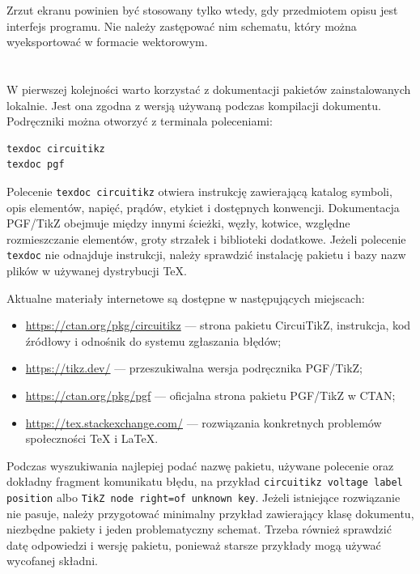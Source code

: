 Zrzut ekranu powinien być stosowany tylko wtedy, gdy przedmiotem opisu jest interfejs
programu. Nie należy zastępować nim schematu, który można wyeksportować w formacie
wektorowym.

\section{}

W pierwszej kolejności warto korzystać z dokumentacji pakietów zainstalowanych lokalnie.
Jest ona zgodna z wersją używaną podczas kompilacji dokumentu. Podręczniki można otworzyć
z terminala poleceniami:

\begin{lstlisting}[style=thesis-shell,caption={Otwieranie lokalnej dokumentacji pakietów},label={lst:dokumentacja-tikz}]
texdoc circuitikz
texdoc pgf
\end{lstlisting}

Polecenie \verb|texdoc circuitikz| otwiera instrukcję zawierającą katalog symboli,
opis elementów, napięć, prądów, etykiet i dostępnych konwencji. Dokumentacja PGF/TikZ
obejmuje między innymi ścieżki, węzły, kotwice, względne rozmieszczanie elementów,
groty strzałek i biblioteki dodatkowe. Jeżeli polecenie \texttt{texdoc} nie odnajduje
instrukcji, należy sprawdzić instalację pakietu i bazy nazw plików w używanej dystrybucji
TeX.

Aktualne materiały internetowe są dostępne w następujących miejscach:

\begin{itemize}
  \item \url{https://ctan.org/pkg/circuitikz} --- strona pakietu CircuiTikZ,
        instrukcja, kod źródłowy i odnośnik do systemu zgłaszania błędów;
  \item \url{https://tikz.dev/} --- przeszukiwalna wersja podręcznika PGF/TikZ;
  \item \url{https://ctan.org/pkg/pgf} --- oficjalna strona pakietu PGF/TikZ w CTAN;
  \item \url{https://tex.stackexchange.com/} --- rozwiązania konkretnych problemów
        społeczności TeX i LaTeX.
\end{itemize}

Podczas wyszukiwania najlepiej podać nazwę pakietu, używane polecenie oraz dokładny
fragment komunikatu błędu, na przykład \texttt{circuitikz voltage label position} albo
\texttt{TikZ node right=of unknown key}. Jeżeli istniejące rozwiązanie nie pasuje,
należy przygotować minimalny przykład zawierający klasę dokumentu, niezbędne pakiety
i jeden problematyczny schemat. Trzeba również sprawdzić datę odpowiedzi i wersję
pakietu, ponieważ starsze przykłady mogą używać wycofanej składni.

